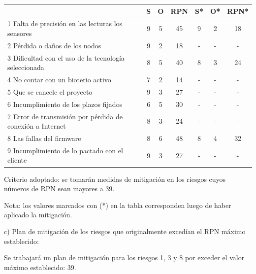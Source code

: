 \documentclass[
11pt, %
]{charter}
\begin{document}
\begin{table}[htpb]
\centering
\begin{tabular}{|l|c|c|c|c|c|c|}
\hline
\rowcolor[HTML]{C0C0C0} 
\multicolumn{1}{|c|}{\cellcolor[HTML]{C0C0C0}Riesgo} & S  & O  & RPN                        & S* & O* & RPN*                       \\ \hline
1 Falta de precisión en las lecturas los sensores & 9  & 5  & 
\cellcolor[HTML]{CB0000}45 & 9  & 2  & 
\cellcolor[HTML]{009901}18  \\ \hline
2 Pérdida o daños de los nodos & 9 & 2 & 
\cellcolor[HTML]{009901}18 & - & - & - \\ \hline
3 Dificultad con el uso de la tecnología seleccionada  &8    &5    & 
\cellcolor[HTML]{CB0000}40 & 8 & 3 & 
\cellcolor[HTML]{009901}24 \\ \hline
4 No contar con un bioterio activo &7    &2    &
\cellcolor[HTML]{009901}14 & - & - & - \\ \hline
5 Que se cancele el proyecto &9 &3 &
\cellcolor[HTML]{009901}27 &- &- &- \\ \hline
6 Incumplimiento de los plazos fijados &6 &5 &
\cellcolor[HTML]{009901}30 &- &- &- \\ \hline
7 Error de transmisión por pérdida de conexión a Internet &8 &3 &
\cellcolor[HTML]{009901}24 &- &- &-\\ \hline
8 Las fallas del firmware &8 &6 & 
\cellcolor[HTML]{CB0000}48 &8 &4 &
\cellcolor[HTML]{009901}32 \\ \hline
9 Incumplimiento de lo pactado con el cliente &9 &3 &
\cellcolor[HTML]{009901}27 &- &- &- \\ \hline
\end{tabular}
\end{table}

Criterio adoptado: 
se tomarán medidas de mitigación en los riesgos cuyos números de RPN sean mayores a 39.

Nota: los valores marcados con (*) en la tabla corresponden luego de haber aplicado la mitigación.

c) Plan de mitigación de los riesgos que originalmente excedían el RPN máximo establecido:

Se trabajará un plan de mitigación para los riesgos 1, 3 y 8 por exceder el valor máximo establecido: 39.
 
\end{document}
